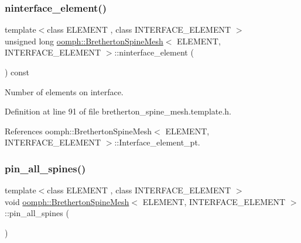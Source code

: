 \mbox{\label{classoomph_1_1BrethertonSpineMesh_ae1ecd7c00fe1032e1ee16d7a98156d5c}} 
\subsubsection{\texorpdfstring{ninterface\+\_\+element()}{ninterface\_element()}}
{\footnotesize\ttfamily template$<$class E\+L\+E\+M\+E\+NT , class I\+N\+T\+E\+R\+F\+A\+C\+E\+\_\+\+E\+L\+E\+M\+E\+NT $>$ \\
unsigned long \hyperlink{classoomph_1_1BrethertonSpineMesh}{oomph\+::\+Bretherton\+Spine\+Mesh}$<$ E\+L\+E\+M\+E\+NT, I\+N\+T\+E\+R\+F\+A\+C\+E\+\_\+\+E\+L\+E\+M\+E\+NT $>$\+::ninterface\+\_\+element (\begin{DoxyParamCaption}{ }\end{DoxyParamCaption}) const\hspace{0.3cm}{\ttfamily [inline]}}



Number of elements on interface. 



Definition at line 91 of file bretherton\+\_\+spine\+\_\+mesh.\+template.\+h.



References oomph\+::\+Bretherton\+Spine\+Mesh$<$ E\+L\+E\+M\+E\+N\+T, I\+N\+T\+E\+R\+F\+A\+C\+E\+\_\+\+E\+L\+E\+M\+E\+N\+T $>$\+::\+Interface\+\_\+element\+\_\+pt.

\mbox{\label{classoomph_1_1BrethertonSpineMesh_a507ea97977b837f2f0d9647407d770cd}} 
\subsubsection{\texorpdfstring{pin\+\_\+all\+\_\+spines()}{pin\_all\_spines()}}
{\footnotesize\ttfamily template$<$class E\+L\+E\+M\+E\+NT , class I\+N\+T\+E\+R\+F\+A\+C\+E\+\_\+\+E\+L\+E\+M\+E\+NT $>$ \\
void \hyperlink{classoomph_1_1BrethertonSpineMesh}{oomph\+::\+Bretherton\+Spine\+Mesh}$<$ E\+L\+E\+M\+E\+NT, I\+N\+T\+E\+R\+F\+A\+C\+E\+\_\+\+E\+L\+E\+M\+E\+NT $>$\+::pin\+\_\+all\+\_\+spines (\begin{DoxyParamCaption}{ }\end{DoxyParamCaption})\hspace{0.3cm}{\ttfamily [inline]}}

